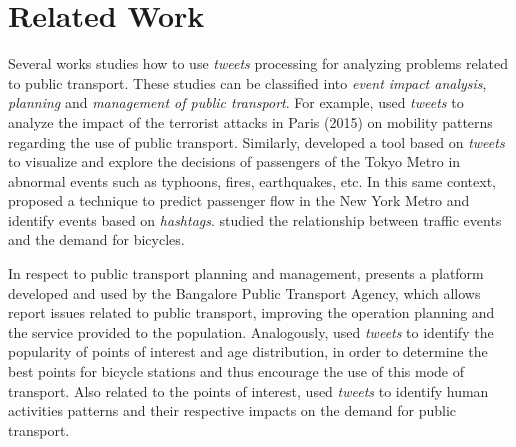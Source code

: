 \documentclass[runningheads]{llncs}
\begin{document}
\section{Related Work}
\label{relatedWorks}
%
Several works studies how to use \textit{tweets} processing for analyzing problems related to public transport. These studies can be classified into \emph{event impact analysis}, \emph{planning} and \emph{management of public transport}. For example, \cite{Wen2016} used \textit{tweets} to analyze the impact of the terrorist attacks in Paris (2015) on mobility patterns regarding the use of public transport. Similarly, \cite{Itoh2016} developed a tool based on \textit{tweets} to visualize and explore the decisions of passengers of the Tokyo Metro in abnormal events such as typhoons, fires, earthquakes, etc. In this same context, \cite{Ni2016} proposed a technique to predict passenger flow in the New York Metro and identify events based on \textit{hashtags}. \cite{Chen2016} studied the relationship between traffic events and the demand for bicycles.

In respect to public transport planning and management, \cite{Mukherjee2015} presents a platform developed and used by the Bangalore Public Transport Agency, which allows report issues related to public transport, improving the operation planning and the service provided to the population. Analogously, \cite{Gutev2016} used \textit{tweets} to identify the popularity of points of interest and age distribution, in order to determine the best points for bicycle stations and thus encourage the use of this mode of transport. Also related to the points of interest, \cite{Maghrebi2015} used \textit{tweets} to identify human activities patterns and their respective impacts on the demand for public transport.
\end{document}
